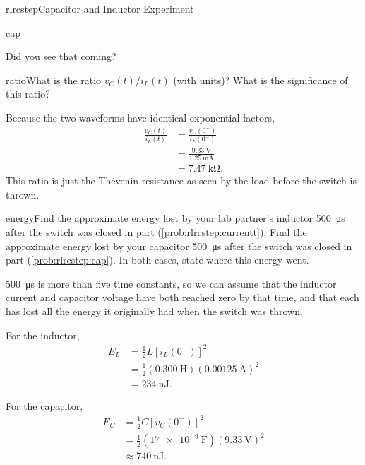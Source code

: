 \begin{mainquestion}{rlrcstep}{Capacitor and Inductor Experiment}
\begin{partquestion}{cap}
\begin{answer}
Did you see that coming?
\end{answer}
\end{partquestion}
\begin{partquestion}{ratio}{What is the ratio $v_C(t)/i_L(t)$ (with units)? What is the significance of this ratio? }
\begin{answer}
Because the two waveforms have identical exponential factors,
\begin{align*}
 \frac{v_C(t)}{i_L(t)}
 &= \frac{v_C(0^-)}{i_L(0^-)} \\
 &= \frac{\SI{9.33}{\volt}}{\SI{1.25}{\milli\ampere}} \\
 &= \boxed{\SI{7.47}{\kilo\ohm}}.
\end{align*}
This ratio is just the Th\'evenin resistance as seen by the load before the switch is thrown.
\end{answer}
\end{partquestion}
\begin{partquestion}{energy}{Find the approximate energy lost by your lab partner's inductor \SI{500}{\micro\second} after the switch was closed in part (\cref{prob:rlrcstep:currentt}). Find the approximate energy lost by your capacitor \SI{500}{\micro\second} after the switch was closed in part (\cref{prob:rlrcstep:cap}). In both cases, state where this energy went.}
\begin{answer}
\SI{500}{\micro\second} is more than five time constants, so we can assume that the inductor current and capacitor voltage have both reached zero by that time, and that each has lost all the energy it originally had when the switch was thrown.

For the inductor,
\begin{align*}
 E_L
 &= \frac{1}{2}L\left[i_L(0^-)\right]^2 \\
 &= \frac{1}{2}(\SI{0.300}{\henry})
    (\SI{0.00125}{\ampere})^2 \\
 &= \boxed{\SI{234}{\nano\joule}}.
\end{align*}

For the capacitor,
\begin{align*}
 E_C
 &= \frac{1}{2}C\left[v_C(0^-)\right]^2 \\
 &= \frac{1}{2}(\SI{17e-9}{\farad})(\SI{9.33}{\volt})^2 \\
 &\approx \boxed{\SI{740}{\nano\joule}}.
\end{align*}


\end{answer}
\end{partquestion}
\end{mainquestion}
